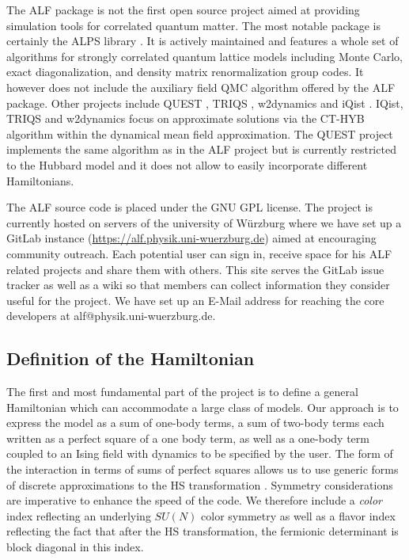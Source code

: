 \documentclass{SciPost}
\begin{document}
The ALF package is  not the first open source project  aimed at providing simulation tools for correlated quantum matter.  The most  notable package is  certainly the ALPS library \cite{ALPS_2.0}.  It  is actively maintained and features a whole set of algorithms for strongly correlated quantum lattice models including Monte Carlo, exact diagonalization, and density matrix renormalization group codes. It however does not include the auxiliary field  QMC algorithm   offered by the ALF package.
 Other projects  include
QUEST \cite{QUEST}, TRIQS \cite{TRIQS}, w2dynamics \cite{w2dyn} and  iQist \cite{iQIST}.
IQist, TRIQS and w2dynamics focus on approximate solutions via the CT-HYB \cite{Gull_rev} algorithm within the dynamical mean field approximation.  
The QUEST project implements the same algorithm as in the ALF project  but  is currently restricted to the  Hubbard model
and it does not allow to easily incorporate different Hamiltonians. 


The ALF source code  is placed  under the GNU GPL license.  The project is currently hosted on servers of the university of W\"urzburg  where 
 we have set up a GitLab instance (\url{https://alf.physik.uni-wuerzburg.de}) aimed at encouraging  community outreach. 
 Each  potential user can sign in, receive space for his ALF related projects and share them with others. This site serves the GitLab issue tracker  as well as  a wiki
so that members can collect information they consider useful for the project.
We have set up an E-Mail address for reaching the core developers at alf@physik.uni-wuerzburg.de.

%
\subsection{Definition of the Hamiltonian}
%
The first and most fundamental part of the project  is to define a general Hamiltonian which  can  accommodate a large class of models. 
Our approach is to express the model as a sum of one-body terms, a sum of two-body terms each written as a perfect square of a one body term, as well as a one-body term coupled to an Ising field with  dynamics to be specified by the user. 
The form of the interaction in terms of sums of perfect squares allows us to use generic forms of  discrete  approximations to the  HS  transformation \cite{Motome97,Assaad97}.
Symmetry considerations  are  imperative to enhance the speed of the code.  
We therefore include a \textit{color} index  reflecting  an underlying  $SU(N)$ color symmetry as  well as a flavor index  reflecting  the fact that  after  the HS  transformation,  the  fermionic determinant is block diagonal in this index.
\end{document}
